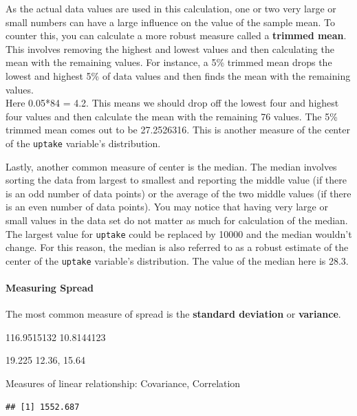 \documentclass[
]{book}
\newenvironment{Shaded}{\begin{snugshade}}{\end{snugshade}}
\newcommand{\KeywordTok}[1]{\textcolor[rgb]{0.13,0.29,0.53}{\textbf{#1}}}
\newcommand{\NormalTok}[1]{#1}
\newcommand{\OperatorTok}[1]{\textcolor[rgb]{0.81,0.36,0.00}{\textbf{#1}}}
\let\oldparagraph\paragraph
\renewcommand{\paragraph}[1]{\oldparagraph{#1}\mbox{}}
\theoremstyle{definition}
\theoremstyle{definition}
\theoremstyle{definition}
\theoremstyle{remark}
\begin{document}
As the actual data values are used in this calculation, one or two very large or small numbers can have a large influence on the value of the sample mean. To counter this, you can calculate a more robust measure called a \textbf{trimmed mean}. This involves removing the highest and lowest values and then calculating the mean with the remaining values. For instance, a 5\% trimmed mean drops the lowest and highest 5\% of data values and then finds the mean with the remaining values.\\
Here 0.05*84 = 4.2. This means we should drop off the lowest four and highest four values and then calculate the mean with the remaining 76 values. The 5\% trimmed mean comes out to be 27.2526316. This is another measure of the center of the \texttt{uptake} variable's distribution.

Lastly, another common measure of center is the median. The median involves sorting the data from largest to smallest and reporting the middle value (if there is an odd number of data points) or the average of the two middle values (if there is an even number of data points). You may notice that having very large or small values in the data set do not matter as much for calculation of the median. The largest value for \texttt{uptake} could be replaced by 10000 and the median wouldn't change. For this reason, the median is also referred to as a robust estimate of the center of the \texttt{uptake} variable's distribution. The value of the median here is 28.3.

\hypertarget{measuring-spread}{%
\paragraph{Measuring Spread}\label{measuring-spread}}

The most common measure of spread is the \textbf{standard deviation} or \textbf{variance}.

116.9515132
10.8144123

19.225
12.36, 15.64

Measures of linear relationship: Covariance, Correlation

\begin{Shaded}
\end{Shaded}

\begin{verbatim}
## [1] 1552.687
\end{verbatim}
\end{document}
